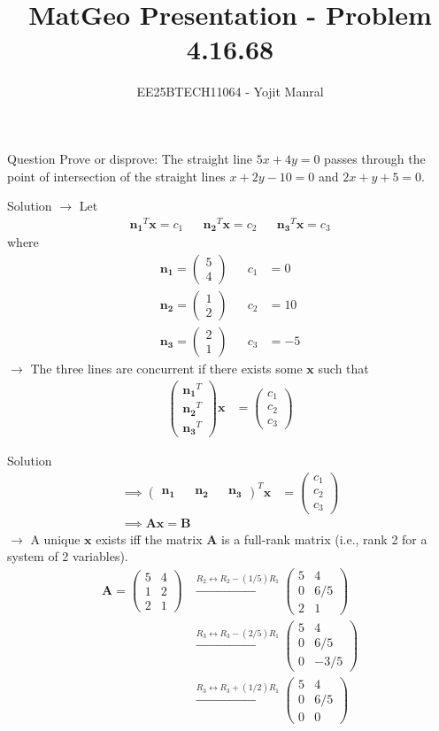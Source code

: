 \documentclass{beamer}
\title{MatGeo Presentation - Problem 4.16.68}
\author{EE25BTECH11064 - Yojit Manral}
\date{}
\numberwithin{equation}{section}
\theoremstyle{remark}
\newcommand{\myvec}[1]{\ensuremath{\begin{pmatrix}#1\end{pmatrix}}}
\let\vec\mathbf
\begin{document}
\frame{\titlepage}
\begin{frame}{Question}
Prove or disprove: The straight line $5x + 4y = 0$ passes through the point of intersection of the straight lines $x + 2y - 10 = 0$ and $2x + y + 5 = 0$.
\end{frame}

\begin{frame}{Solution}
$\rightarrow$ Let
\begin{align*}
    \vec{n_1}^T\vec{x} = c_1 && \vec{n_2}^T\vec{x} = c_2 && \vec{n_3}^T\vec{x} = c_3
\end{align*}
\hspace{0.3cm} where
\begin{align}
    \vec{n_1} = \myvec{5\\4} && c_1 &= 0 \\
    \vec{n_2} = \myvec{1\\2} && c_2 &= 10 \\
    \vec{n_3} = \myvec{2\\1} && c_3 &= -5
\end{align}
$\rightarrow$ The three lines are concurrent if there exists some $\vec{x}$ such that
\begin{align}
    \myvec{\vec{n_1}^T\\\vec{n_2}^T\\\vec{n_3}^T} \vec{x} &= \myvec{c_1\\c_2\\c_3}
\end{align}
\end{frame}

\begin{frame}{Solution}
\begin{align}
    \implies \myvec{\vec{n_1}&&\vec{n_2}&&\vec{n_3}}^{T} \vec{x} &= \myvec{c_1\\c_2\\c_3} \\
    \implies \vec{A}\vec{x} = \vec{B}
\end{align}
$\rightarrow$ A unique $\vec{x}$ exists iff the matrix $\vec{A}$ is a full-rank matrix (i.e., rank 2 for a system of 2 variables).
\begin{align}
    \vec{A} = \myvec{5&4\\1&2\\2&1}
    &\xrightarrow{R_2 \leftrightarrow R_2 - (1/5)R_1} \myvec{5&4\\0&6/5\\2&1}\\
    &\xrightarrow{R_3 \leftrightarrow R_3 - (2/5)R_1} \myvec{5&4\\0&6/5\\0&-3/5}\\
    &\xrightarrow{R_3 \leftrightarrow R_3 + (1/2)R_1} \myvec{5&4\\0&6/5\\0&0}
\end{align}
\end{frame}
\end{document}
